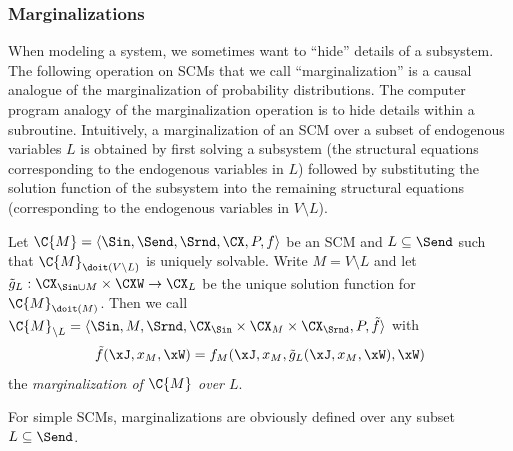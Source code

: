 \subsubsection{Marginalizations}

When modeling a system, we sometimes want to ``hide'' details of a subsystem. The following operation
on SCMs that we call ``marginalization'' is a causal analogue of the marginalization of probability distributions.
The computer program analogy of the marginalization operation is to hide details within a subroutine.
Intuitively, a marginalization of an SCM over a subset of endogenous variables $L$ is obtained by first 
solving a subsystem (the structural equations
corresponding to the endogenous variables in $L$) followed by substituting the solution function of the 
subsystem into the remaining structural equations
(corresponding to the endogenous variables in $V\setminus L$).
\begin{Def}
  Let $\C{M} = \langle \Sin, \Send, \Srnd, \CX, P, f \rangle$ be an SCM and $L \subseteq \Send$ such that
  $\C{M}_{\doit(V\setminus L)}$ is uniquely solvable.
  Write $M = V \setminus L$ and let $\tilde{g}_L : \CX_{\Sin \cup M} \times \CXW \to \CX_L$
  be the unique solution function for $\C{M}_{\doit(M)}$.
  Then we call $\C{M}_{\setminus L} = \langle \Sin, M, \Srnd, \CX_{\Sin} \times \CX_{M} \times \CX_{\Srnd}, P, \tilde{f} \rangle$ with
  $$\tilde{f}(\xJ,x_{M},\xW) = f_{M}(\xJ,x_{M},\tilde{g}_L(\xJ,x_{M},\xW),\xW)$$
  the \emph{marginalization of $\C{M}$ over $L$}.
\end{Def}
For simple SCMs, marginalizations are obviously defined over any subset $L \subseteq \Send$.


